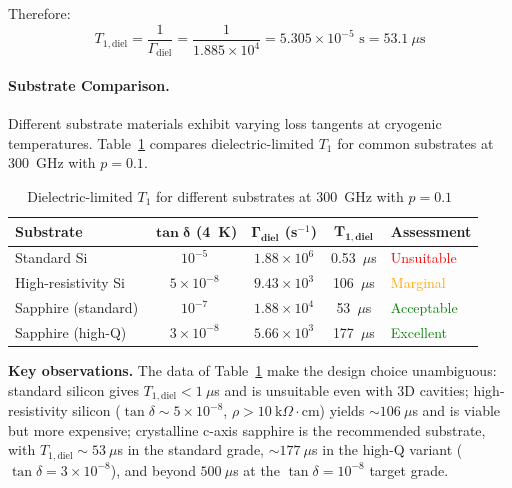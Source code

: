 Therefore:
\begin{equation}
T_{1,\text{diel}} = \frac{1}{\Gamma_{\text{diel}}} = \frac{1}{1.885 \times 10^{4}} = 5.305 \times 10^{-5} \text{ s} = 53.1~\mu\text{s}
\label{eq:t1_sapphire}
\end{equation}

\paragraph{Substrate Comparison.}
Different substrate materials exhibit varying loss tangents at cryogenic temperatures. Table~\ref{tab:substrate_t1_diel} compares dielectric-limited $T_1$ for common substrates at 300~GHz with $p = 0.1$.

\begin{table}[h]
\centering
\caption{Dielectric-limited $T_1$ for different substrates at 300~GHz with $p=0.1$~\cite{Krupka2006Silicon, Janezic2014Silicon, Krupka1999Sapphire,Read2023Sapphire}}
\label{tab:substrate_t1_diel}
\begin{tabular}{@{}lcccl@{}}
\toprule
\textbf{Substrate} & $\mathbf{\tan\delta}$ (4~K) & $\mathbf{\Gamma_{\text{diel}}}$ (s$^{-1}$) & $\mathbf{T_{1,\text{diel}}}$ & \textbf{Assessment} \\
\midrule
Standard Si & $10^{-5}$        & $1.88 \times 10^{6}$ & 0.53~$\mu$s  & \textcolor{red}{Unsuitable} \\
High-resistivity Si & $5 \times 10^{-8}$ & $9.43 \times 10^{3}$ & 106~$\mu$s   & \textcolor{orange}{Marginal} \\
Sapphire (standard) & $10^{-7}$        & $1.88 \times 10^{4}$ & 53~$\mu$s    & \textcolor{green}{Acceptable} \\
Sapphire (high-Q)  & $3 \times 10^{-8}$ & $5.66 \times 10^{3}$ & 177~$\mu$s   & \textcolor{green}{Excellent} \\
\bottomrule
\end{tabular}
\end{table}

\textbf{Key observations.} The data of Table~\ref{tab:substrate_t1_diel}
make the design choice unambiguous: standard silicon gives $T_{1,\text{diel}}<1~\mu$s
and is unsuitable even with 3D cavities; high-resistivity silicon
($\tan\delta \sim 5\times 10^{-8}$, $\rho > 10~\text{k}\Omega\cdot\text{cm}$)
yields $\sim 106~\mu$s and is viable but more expensive; crystalline c-axis
sapphire is the recommended substrate, with $T_{1,\text{diel}}\sim 53~\mu$s
in the standard grade, $\sim 177~\mu$s in the high-Q variant
($\tan\delta = 3\times10^{-8}$), and beyond $500~\mu$s at the
$\tan\delta = 10^{-8}$ target grade.

